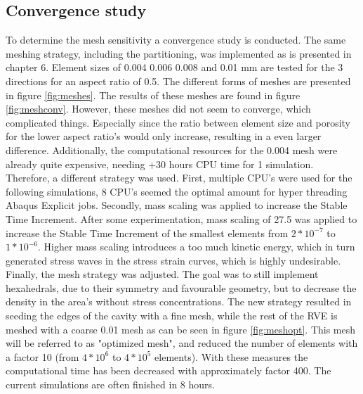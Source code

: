 \subsection{Convergence study}
To determine the mesh sensitivity a convergence study is conducted. The same meshing strategy, including the partitioning, was implemented as is presented in chapter 6. Element sizes of 0.004 0.006 0.008 and 0.01 mm are tested for the 3 directions for an aspect ratio of 0.5. The different forms of meshes are presented in figure \ref{fig:meshes}. The results of these meshes are found in figure \ref{fig:meshconv}. However, these meshes did not seem to converge, which complicated things. Especially since the ratio between element size and porosity for the lower aspect ratio's would only increase, resulting in a even larger difference.  Additionally, the computational resources for the 0.004 mesh were already quite expensive, needing +30 hours CPU time for 1 simulation. Therefore, a different strategy was used. First, multiple CPU's were used for the following simulations, 8 CPU's seemed the optimal amount for hyper threading Abaqus Explicit jobs. Secondly, mass scaling was applied to increase the Stable Time Increment. After some experimentation, mass scaling of 27.5 was applied to increase the Stable Time Increment of the smallest elements from $2*10^{-7}$ to $1*10^{-6}$. Higher mass scaling introduces a too much kinetic energy, which in turn generated stress waves in the stress strain curves, which is highly undesirable. Finally, the mesh strategy was adjusted. The goal was to still implement hexahedrals, due to their symmetry and favourable geometry, but to decrease the density in the area's without stress concentrations. The new strategy resulted in seeding the edges of the cavity with a fine mesh, while the rest of the RVE is meshed with a coarse 0.01 mesh as can be seen in figure \ref{fig:meshopt}. This mesh will be referred to as "optimized mesh", and reduced the number of elements with a factor 10 (from $4*10^6$ to $4*10^5$ elements). With these measures the computational time has been decreased with approximately factor  400. The current simulations are often finished in 8 hours. 

